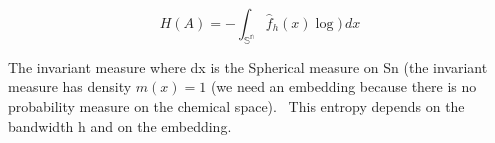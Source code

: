 \[ H(A) = -\int_\mathbb{{S}^n}  \hat{f}_h(x)\log )\,dx  \]



The invariant measure where dx is the Spherical measure on Sn (the invariant measure has density $m(x)=1$ (we need an embedding because there is no probability measure on the chemical space). 
This entropy depends on the bandwidth h and on the embedding.
